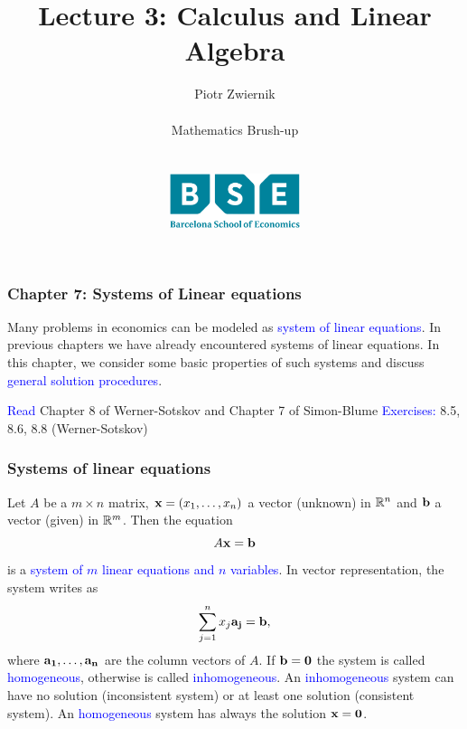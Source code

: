 \documentclass[11pt,aspectratio=169]{beamer}
\title[Calculus and Linear Algebra]{Lecture 3: Calculus and Linear Algebra}
\author[Piotr Zwiernik, Barcelona School of Economics]{Piotr Zwiernik \\ $\;$\\
Mathematics Brush-up\\ $\;$\\ $\;$\\
\includegraphics[width=1.5in]{img/bse.png}  
}
\date{}
\begin{document}
\begin{frame}
\titlepage
\end{frame}


\begin{frame}
\frametitle{Chapter 7: Systems of Linear equations}
\begin{small}
Many problems in economics can be modeled as \textcolor{blue}{system of linear equations}.
\vskip 12pt
In previous chapters we have already encountered systems of linear equations.
\vskip 12pt
In this chapter, we consider some basic properties of such systems and discuss \textcolor{blue}{general solution procedures}.

\vskip 12pt
\textcolor{blue}{Read}  Chapter 8 of Werner-Sotskov and Chapter 7 of Simon-Blume
\vskip 12pt
 \textcolor{blue}{Exercises:} 8.5, 8.6, 8.8 (Werner-Sotskov)


\end{small}
\end{frame}


\begin{frame}
\frametitle{Systems of linear equations}
\begin{small}
 Let $A$ be a $m \times n$ matrix, ${\bf x}=(x_1, \ldots, x_n)$ a vector (unknown) in $\mathbb R^n$ and ${\bf b}$ a vector (given) in $\mathbb R^m$. Then the equation $$A {\bf x}={\bf b}$$ is a \textcolor{blue}{system of $m$ linear equations and $n$ variables}.
\vskip 12pt
In vector representation, the system writes as 
$$
\sum_{j=1}^n x_j {\bf a_j}={\bf b},
$$
where ${\bf a_1},\dots, {\bf a_n}$ are the column vectors of  $A$.
\vskip 12pt
If ${\bf b}={\bf 0}$ the system is called \textcolor{blue}{homogeneous}, otherwise is called \textcolor{blue}{inhomogeneous}.
An \textcolor{blue}{inhomogeneous} system can have  no solution (inconsistent system) or at least one solution  (consistent system).
An \textcolor{blue}{homogeneous} system has always the solution ${\bf x}={\bf 0}$.

\end{small}
\end{frame}
\end{document}
